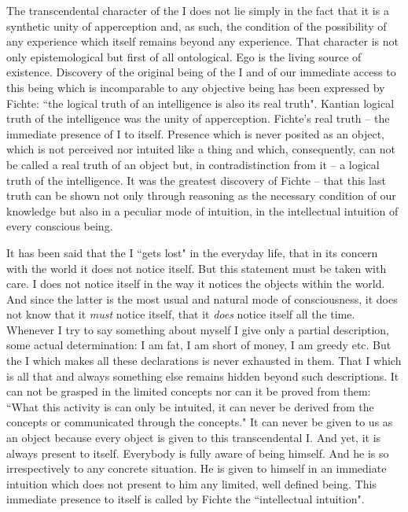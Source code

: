 The transcendental character of the I does not lie simply in the fact that it is a synthetic unity of apperception 
and, as such, the condition of the possibility of any experience which itself remains beyond any experience. That 
character is not only epistemological but first of all ontological. Ego is the living source of existence. Discovery 
of the original being of the I and of our immediate access to this being which is incomparable to any objective 
being has been expressed by Fichte: ``the logical truth of an intelligence is also its real truth". Kantian logical truth 
of the intelligence was the unity of apperception. Fichte's real truth -- the immediate presence of I to itself. 
Presence which is never posited as an object, which is not perceived nor intuited like a thing and which, 
consequently, can not be called a real truth of an object but, in contradistinction from it -- a logical truth of the 
intelligence. It was the greatest discovery of Fichte -- that this last truth can be shown not only through reasoning 
as the necessary condition of our knowledge but also in a peculiar mode of intuition, in the intellectual intuition of 
every conscious being.

It has been said that the I ``gets lost" in the everyday life, that in its concern with the world it does not notice 
itself. But this statement must be taken with care. I does not notice itself in the way it notices the objects 
within the world. And since the latter is the most usual and natural mode of consciousness, it does not know that 
it {\em must} notice itself, that it {\em does} notice itself all the time. Whenever I try to say something about myself I give 
only a partial description, some actual determination: I am fat, I am short of money, I am greedy  etc. But the I 
which makes all these declarations is never exhausted in them. That I which is all that and always something else 
remains hidden beyond  such descriptions. It can not be grasped in the limited concepts nor can it be proved 
from them: ``What this activity is can only be intuited, it can never be derived from the concepts or communicated 
through the concepts." \cite{ITS} It can never be given to us as an object because every object is given to this transcendental 
I. And yet, it is always present to itself. Everybody is fully aware of being himself. And he is so irrespectively to 
any concrete situation. He is given to himself in an immediate intuition which does not present to him any 
limited, well defined being. This immediate presence to itself is called by Fichte the ``intellectual intuition".

